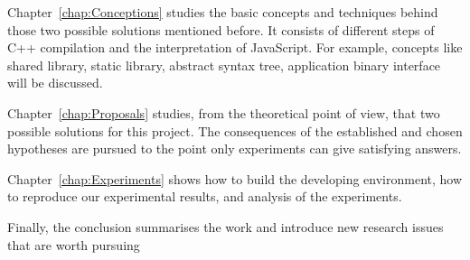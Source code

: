 Chapter~\ref{chap:Conceptions} studies the basic concepts and techniques behind those two possible solutions mentioned before. It consists of different steps of C++ compilation and the interpretation of JavaScript. For example, concepts like shared library, static library, abstract syntax tree, application binary interface will be discussed. 

Chapter~\ref{chap:Proposals} studies, from the theoretical point of view, that two possible solutions for this project. The consequences of the established and chosen hypotheses are pursued to the point only experiments can give satisfying answers.

Chapter~\ref{chap:Experiments} shows how to build the developing environment, how to reproduce our experimental results, and analysis of the experiments.

Finally, the conclusion summarises the work and introduce new research issues that are worth pursuing

